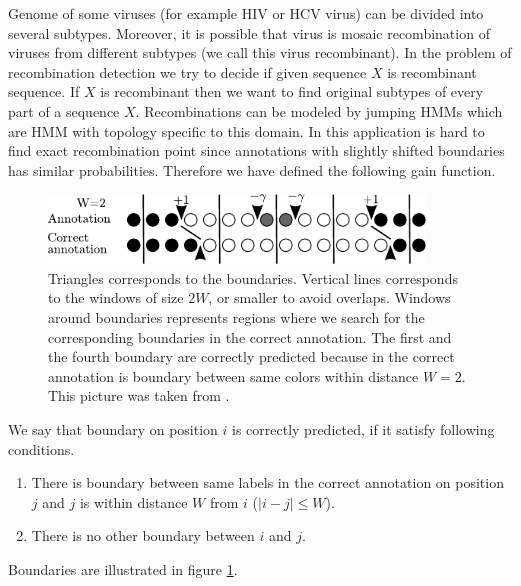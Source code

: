 Genome of some viruses (for example HIV or HCV virus) can be divided into
several subtypes. Moreover, it is possible that virus is mosaic
recombination of viruses from different subtypes (we call this virus
recombinant). In the problem of recombination detection we try to decide if
given sequence $X$ is recombinant sequence. If $X$ is recombinant then we want to find
original subtypes of every part of a sequence $X$. Recombinations can be modeled
by jumping HMMs \cite{Schultz2006} which are HMM with topology specific to this domain.
In this application is 
hard to find exact recombination point since annotations with slightly shifted
boundaries has similar probabilities. Therefore we have defined the following gain
function.

\begin{figure}
\begin{center}
\includegraphics[width=10cm]{../figures/HERDbuddy.pdf}
\end{center}
\caption[Highest Expected Reward Decoding explanation]{
Triangles corresponds to the boundaries. Vertical lines corresponds to the windows
of size $2W$, or smaller to avoid overlaps. Windows around boundaries
represents regions where we search for the corresponding boundaries in the correct
annotation.
The first and the fourth boundary are correctly predicted because in the correct
annotation is boundary between same colors within distance $W=2$.
This picture was taken from \cite{Nanasi2010mgr}.
}\label{FIGURE:HERDBUDDY}
\end{figure}

We say that boundary on position $i$ is correctly predicted, if it satisfy
following conditions.
\begin{enumerate}
\item There is boundary between same labels in the correct annotation on position $j$ and $j$ is
within distance $W$ from $i$ ($|i-j|\leq W$).
\item There is no other boundary between $i$ and $j$. 
\end{enumerate}
Boundaries are illustrated in figure \ref{FIGURE:HERDBUDDY}. 

